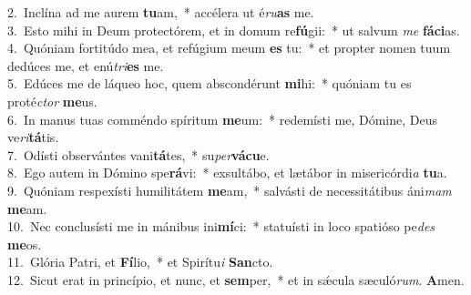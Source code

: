{2.~}Inclína ad me aurem \textbf{tu}am,~* accélera ut é\textit{ru}\textbf{as} me.\\
{3.~}Esto mihi in Deum protectórem, et in domum re\textbf{fú}gii:~* ut salvum \textit{me} \textbf{fá}\textbf{ci}as.\\
{4.~}Quóniam fortitúdo mea, et refúgium meum \textbf{es} tu:~* et propter nomen tuum dedúces me, et enú\textit{tri}\textbf{es} me.\\
{5.~}Edúces me de láqueo hoc, quem abscondérunt \textbf{mi}hi:~* quóniam tu es proté\textit{ctor} \textbf{me}us.\\
{6.~}In manus tuas comméndo spíritum \textbf{me}um:~* redemísti me, Dómine, Deus ve\textit{ri}\textbf{tá}tis.\\
{7.~}Odísti observántes vani\textbf{tá}tes,~* su\textit{per}\textbf{vá}\textbf{cu}e.\\
{8.~}Ego autem in Dómino spe\textbf{rá}vi:~* exsultábo, et lætábor in misericórdi\textit{a} \textbf{tu}a.\\
{9.~}Quóniam respexísti humilitátem \textbf{me}am,~* salvásti de necessitátibus áni\textit{mam} \textbf{me}am.\\
{10.~}Nec conclusísti me in mánibus ini\textbf{mí}ci:~* statuísti in loco spatióso pe\textit{des} \textbf{me}os.\\
{11.~}Glória Patri, et \textbf{Fí}lio,~* et Spirítu\textit{i} \textbf{San}cto.\\
{12.~}Sicut erat in princípio, et nunc, et \textbf{sem}per,~* et in sǽcula sæculó\textit{rum}. \textbf{A}men.\\
